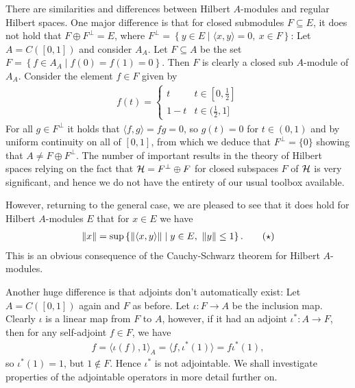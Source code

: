 \begin{note}
	There are similarities and differences between Hilbert $A$-modules and regular Hilbert spaces. One major difference is that for closed submodules $F\subseteq E$, it does not hold that $F \oplus F^\perp=E$, where $F^\perp = \left\{ y \in E \mid \langle x,y\rangle = 0, \ x \in F \right\}$: Let $A=C([0,1])$ and consider $A_A$. Let $F\subseteq A$ be the set $F = \left\{f \in A_A \mid f(0)=f(1)=0  \right\}$. Then $F$ is clearly a closed sub $A$-module of $A_A$. Consider the element $f \in F$ given by
	\begin{align*}
		f(t) = \begin{cases}
			t & t \in [0,\frac12]\\
		1-t & t \in (\frac12,1]
		\end{cases}
	\end{align*}
	For all $g \in F^\perp$ it holds that $\langle f,g\rangle = fg = 0$, so $g(t)=0$ for $t \in (0,1)$ and by uniform continuity on all of $[0,1]$, from which we deduce that $F^\perp = \{0\}$ showing that $A \neq F \oplus F^\perp$. The number of important results in the theory of Hilbert spaces relying on the fact that $\mathcal{H} =  F^\perp \oplus F$ for closed subspaces $F$ of $\mathcal{H}$ is very significant, and hence we do not have the entirety of our usual toolbox available. 

	However, returning to the general case, we are pleased to see that it does hold for Hilbert $A$-modules $E$ that for $x \in E$ we have
	\begin{align}
		\left\lVert x \right\rVert = \sup\left\{ \left\lVert \langle x , y \rangle \right\rVert \mid y \in E, \ \left\lVert y \right\rVert \leq 1 \right\}. \tag{$\star$}
		\label{eq:0}
	\end{align}
	This is an obvious consequence of the Cauchy-Schwarz theorem for Hilbert $A$-modules. 

	Another huge difference is that adjoints don't automatically exist: Let $A = C([0,1])$ again and $F$ as before. Let $ \iota \colon F \to A$ be the inclusion map. Clearly $\iota$ is a linear map from $F$ to $A$, however, if it had an adjoint $\iota^* \colon A \to F$, then for any self-adjoint $f \in F$, we have
	\begin{align*}
		 f = \langle \iota(f) , 1 \rangle_A = \langle f , \iota^*(1)\rangle = f \iota^*(1),
	\end{align*}
	so $\iota^*(1)=1$, but $1 \not\in F$. Hence $\iota^*$ is not adjointable. We shall investigate properties of the adjointable operators in more detail further on.
\end{note}

